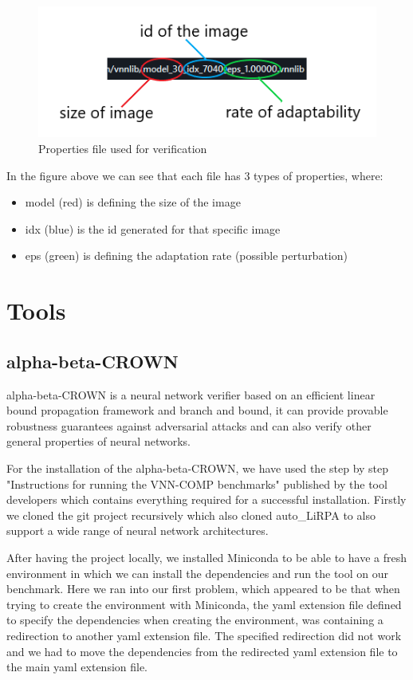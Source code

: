 \documentclass[12pt,a4paper]{report}
\newcommand\tab[1][5mm]{\hspace*{#1}}
\begin{document}
\begin{figure}[h]
\centering
\includegraphics[scale=0.8]{figure3.png}
\caption{Properties file used for verification}
\end{figure}
\tab In the figure above we can see that each file has 3 types of properties, where:
\begin{itemize}
    \item model (red) is defining the size of the image
    \item idx (blue) is the id generated for that specific image
    \item eps (green) is defining the adaptation rate (possible perturbation)
\end{itemize}

\chapter{Tools}
\section{alpha-beta-CROWN}
\tab alpha-beta-CROWN is a neural network verifier based on an efficient linear bound propagation framework and branch and bound, it can provide provable robustness guarantees against adversarial attacks and can also verify other general properties of neural networks\cite{alpha-beta-crown-git}.

\tab For the installation of the alpha-beta-CROWN, we have used the step by step "Instructions for running the VNN-COMP benchmarks"\cite{alpha-beta-instructions} published by the tool developers which contains everything required for a successful installation. Firstly we cloned the git project recursively which also cloned auto\_LiRPA\cite{auto_lirpa_repo} to also support a wide range of neural network architectures.

After having the project locally, we installed Miniconda\cite{miniconda} to be able to have a fresh environment in which we can install the dependencies and run the tool on our benchmark. Here we ran into our first problem, which appeared to be that when trying to create the environment with Miniconda\cite{miniconda}, the yaml extension file defined to specify the dependencies when creating the environment, was containing a redirection to another yaml extension file. The specified redirection did not work and we had to move the dependencies from the redirected yaml extension file to the main yaml extension file.
\end{document}
